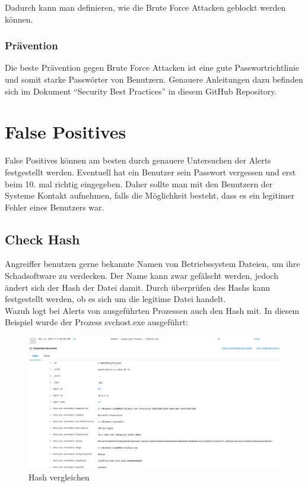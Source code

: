 Dadurch kann man definieren, wie die Brute Force Attacken geblockt werden können.

\subsubsection{Prävention}
Die beste Prävention gegen Brute Force Attacken ist eine gute Passwortrichtlinie und somit starke Passwörter von Benutzern.
Genauere Anleitungen dazu befinden sich im Dokument ``Security Best Practices'' in diesem GitHub Repository.

\section{False Positives}
False Positives können am besten durch genauere Untersuchen der Alerts festgestellt werden.
Eventuell hat ein Benutzer sein Passwort vergessen und erst beim 10. mal richtig eingegeben. 
Daher sollte man mit den Benutzern der Systeme Kontakt aufnehmen, falls die Möglichkeit besteht, dass es ein legitimer Fehler eines Benutzers war.  

\subsection{Check Hash}
Angreiffer benutzen gerne bekannte Namen von Betriebssystem Dateien, um ihre Schadsoftware zu verdecken.
Der Name kann zwar gefälscht werden, jedoch ändert sich der Hash der Datei damit.
Durch überprüfen des Hashs kann festgestellt werden, ob es sich um die legitime Datei handelt. \\

Wazuh logt bei Alerts von ausgeführten Prozessen auch den Hash mit.
In diesem Beispiel wurde der Prozess svchost.exe ausgeführt:
\begin{figure}[H]
    \centering
    \includegraphics[width=\linewidth]{../img/check-hash-1.png}
    \caption{Hash vergleichen}
\end{figure}

